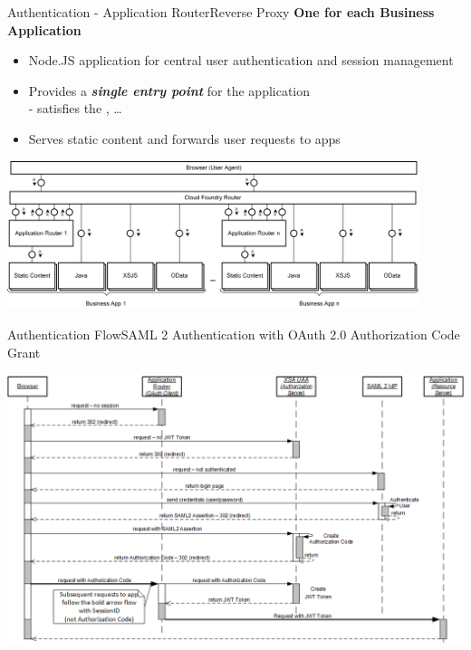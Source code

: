 \begin{frame}{Authentication - Application Router}{Reverse Proxy}
\textbf{One  for each Business Application}
	\begin{itemize}
		\item Node.JS application for central user authentication \newline and session management
		\item Provides a \emph{\textbf{single entry point}} for the application 
		      \\- satisfies the , \ldots
		\item Serves static content and forwards user requests to apps
	\end{itemize}
\vfill
\centerline{\includegraphics[width=0.9\textwidth]{../Security/images/ApplicationRouter}}
\end{frame}


\begin{frame}{Authentication Flow}{SAML 2 Authentication with OAuth 2.0 Authorization Code Grant}
\centerline{\includegraphics[width=1\textwidth]{../Security/images/OAuth2Flow}}
\end{frame}


